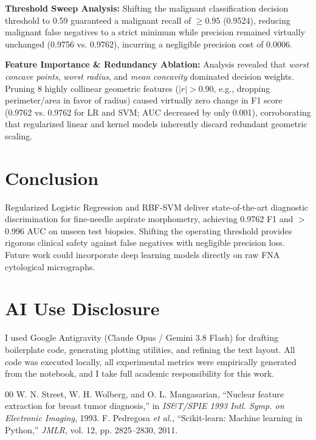 \documentclass[conference]{IEEEtran}
\begin{document}
\textbf{Threshold Sweep Analysis:} Shifting the malignant classification decision threshold to 0.59 guaranteed a malignant recall of $\ge 0.95$ (0.9524), reducing malignant false negatives to a strict minimum while precision remained virtually unchanged (0.9756 vs. 0.9762), incurring a negligible precision cost of 0.0006.

\textbf{Feature Importance \& Redundancy Ablation:} Analysis revealed that \textit{worst concave points}, \textit{worst radius}, and \textit{mean concavity} dominated decision weights. Pruning 8 highly collinear geometric features ($|r| > 0.90$, e.g., dropping perimeter/area in favor of radius) caused virtually zero change in F1 score (0.9762 vs. 0.9762 for LR and SVM; AUC decreased by only 0.001), corroborating that regularized linear and kernel models inherently discard redundant geometric scaling.

\section{Conclusion}
Regularized Logistic Regression and RBF-SVM deliver state-of-the-art diagnostic discrimination for fine-needle aspirate morphometry, achieving 0.9762 F1 and $>$0.996 AUC on unseen test biopsies. Shifting the operating threshold provides rigorous clinical safety against false negatives with negligible precision loss. Future work could incorporate deep learning models directly on raw FNA cytological micrographs.

\section*{AI Use Disclosure}
I used Google Antigravity (Claude Opus / Gemini 3.8 Flash) for drafting boilerplate code, generating plotting utilities, and refining the text layout. All code was executed locally, all experimental metrics were empirically generated from the notebook, and I take full academic responsibility for this work.

\begin{thebibliography}{00}
 W. N. Street, W. H. Wolberg, and O. L. Mangasarian, ``Nuclear feature extraction for breast tumor diagnosis,'' in \textit{IS\&T/SPIE 1993 Intl. Symp. on Electronic Imaging}, 1993.
 F. Pedregosa \textit{et al.}, ``Scikit-learn: Machine learning in Python,'' \textit{JMLR}, vol. 12, pp. 2825--2830, 2011.
\end{thebibliography}
\end{document}
